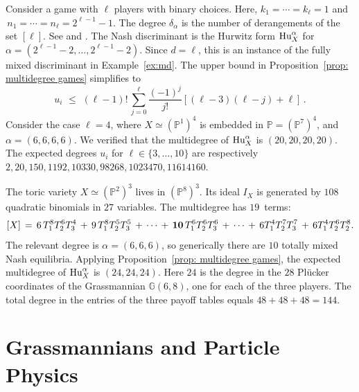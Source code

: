 \documentclass[12pt]{article}
\theoremstyle{definition}
\newenvironment{example}
{\pushQED{\qed}\renewcommand{\qedsymbol}{$\diamond$}\examplex}
{\popQED\endexamplex}
\newcommand{\bG}{\mathbb G}
\newcommand{\bP}{\mathbb P}
\begin{document}
\begin{example}[Binary games]
Consider a game with $\ell$ players with binary choices. Here,
$k_1=\cdots=k_\ell=1$ and $\,n_1 =  \cdots = n_\ell = 2^{\ell-1}-1$. The degree
  $\delta_\alpha$  is the number of derangements of 
  the set $[\ell]$. See 
  \cite[Remark 2.9]{vectorBundleNash}  and  \cite[Corollary 6.9]{CBMS}.
  The Nash discriminant is the Hurwitz form ${\rm Hu}^\alpha_X$
  for $\alpha=(2^{\ell-1}-2,\ldots,2^{\ell-1}-2)$.
  Since $d = \ell$, this is an instance of the fully mixed discriminant in
Example~\ref{ex:md}.
The upper bound in Proposition~\ref{prop: multidegree games} simplifies to
\[
	u_i \,\,\le \,\,(\ell-1)!\,\sum_{j=0}^\ell\frac{(-1)^j}{j!}\left[(\ell-3)(\ell-j)+\ell\right]\,.
\]
Consider the case $\ell = 4$, 
where $X \simeq (\bP^1)^4 $ is embedded in $\bP = (\bP^7)^4$,
and  $\alpha = (6,6,6,6)$. We verified that the multidegree of ${\rm Hu}^\alpha_X$
is $(20,20,20,20)$. The expected degrees $u_i$ for $\ell \in \{3, \ldots, 10\}$ are respectively $2, 20, 150, 1192, 10330, 98268, 1023470, 11614160$.
\end{example}

\begin{example}[Games of format $3 \!\times\! 3\! \times \!3$]
The toric variety $X \simeq (\bP^2)^3$ lives in $(\bP^8)^3$.
Its ideal $I_X$ is generated by $108$ quadratic binomials
in $27$ variables.
The multidegree has $19$~terms:
$$ [X] \,= \, 6 \,T_1^8 T_2^6 T_3^4 \,+ \,9 \,T_1^8 T_2^5 T_3^5 \,+\, \cdots\, +\, {\bf 10} \,T_1^6 T_2^6 T_3^6 
\,+\, \cdots\, + \,6 T_1^4 T_2^7 T_3^7  \,+\,6 T_1^4 T_2^6 T_2^8 . $$
The relevant degree is $\alpha = (6,6,6)$, so generically there are $10$ totally mixed Nash equilibria. Applying Proposition~\ref{prop: multidegree games}, the expected multidegree of ${\rm Hu}^\alpha_X$ is $(24,24,24)$. Here $24$ is the degree in the $28$ Pl\"ucker coordinates of
the Grassmannian $\bG(6,8)$, one for each of the three players.
The total degree in the entries of the three payoff tables equals
$48+48+48=144$.
\end{example}


\section{Grassmannians and Particle Physics}
\label{sec6}
\end{document}
